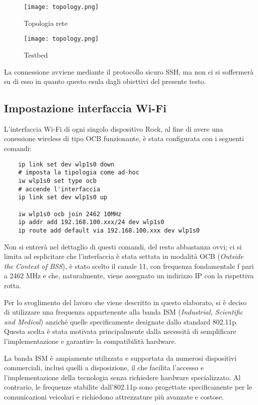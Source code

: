 \begin{figure}[h!]
    \centering
    \texttt{[image: topology.png]}
    \caption{Topologia rete}
    \label{fig:etichetta}
\end{figure}

\begin{figure}[h!]
    \centering
    \texttt{[image: topology.png]}
    \caption{Testbed}
    \label{fig:etichetta_photo}
\end{figure}

La connessione avviene mediante il protocollo sicuro SSH, ma non ci si soffermerà su di esso in quanto questo esula dagli obiettivi del presente testo.

\subsection[Impostazione interfaccia Wi-Fi]{Impostazione interfaccia Wi-Fi}
L'interfaccia Wi-Fi di ogni singolo dispositivo Rock, al fine di avere una conessione wireless di tipo OCB funzionante, è stata configurata con i seguenti comandi:

\begin{lstlisting}
    ip link set dev wlp1s0 down
    # imposta la tipologia come ad-hoc
    iw wlp1s0 set type ocb
    # accende l'interfaccia
    ip link set dev wlp1s0 up
    
    iw wlp1s0 ocb join 2462 10MHz
    ip addr add 192.168.100.xxx/24 dev wlp1s0
    ip route add default via 192.168.100.xxx dev wlp1s0
\end{lstlisting}

Non si entrerà nel dettaglio di questi comandi, del resto abbastanza ovvi; ci si limita ad esplicitare che l'interfaccia è stata settata in modalità OCB (\textit{Outside the Context of BSS}), è stato scelto il canale 11, con frequenza fondamentale f pari a 2462 MHz e che, naturalmente, viene assegnato un indirizzo IP con la rispettiva rotta.

Per lo svoglimento del lavoro che viene descritto in questo elaborato, si è deciso di utilizzare una frequenza appartenente alla banda ISM (\textit{Industrial, Scientific and Medical}) anziché quelle specificamente designate dallo standard 802.11p. Questa scelta è stata motivata principalmente dalla necessità di semplificare l'implementazione e garantire la compatibilità hardware.

La banda ISM è ampiamente utilizzata e supportata da numerosi dispositivi commerciali, inclusi quelli a disposizione, il che facilita l'accesso e l'implementazione della tecnologia senza richiedere hardware specializzato. Al contrario, le frequenze stabilite dall'802.11p sono progettate specificamente per le comunicazioni veicolari e richiedono attrezzature più avanzate e costose.

